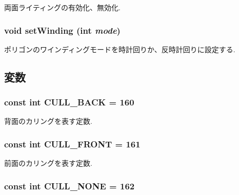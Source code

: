 両面ライティングの有効化、無効化. \hypertarget{classm3g_1_1PolygonMode_5535581a651835a0da246b5936c2f0b5}{
\subsubsection[{setWinding}]{\setlength{\rightskip}{0pt plus 5cm}void setWinding (int {\em mode})}}
\label{classm3g_1_1PolygonMode_5535581a651835a0da246b5936c2f0b5}


ポリゴンのワインディングモードを時計回りか、反時計回りに設定する. 

\subsection{変数}
\hypertarget{classm3g_1_1PolygonMode_34ae9162b765ddbc1d2476edf3195361}{
\subsubsection[{CULL\_\-BACK}]{\setlength{\rightskip}{0pt plus 5cm}const int {\bf CULL\_\-BACK} = 160}}
\label{classm3g_1_1PolygonMode_34ae9162b765ddbc1d2476edf3195361}


背面のカリングを表す定数. \hypertarget{classm3g_1_1PolygonMode_efa180528b010979c6f7732c3c3114ae}{
\subsubsection[{CULL\_\-FRONT}]{\setlength{\rightskip}{0pt plus 5cm}const int {\bf CULL\_\-FRONT} = 161}}
\label{classm3g_1_1PolygonMode_efa180528b010979c6f7732c3c3114ae}


前面のカリングを表す定数. \hypertarget{classm3g_1_1PolygonMode_48717ad405f481d0f2ab8e948bf86822}{
\subsubsection[{CULL\_\-NONE}]{\setlength{\rightskip}{0pt plus 5cm}const int {\bf CULL\_\-NONE} = 162}}
\label{classm3g_1_1PolygonMode_48717ad405f481d0f2ab8e948bf86822}


